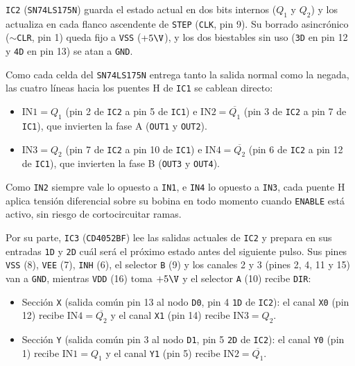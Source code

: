 \texttt{IC2} (\texttt{SN74LS175N}) guarda el estado actual en dos bits internos ($Q_1$ y $Q_2$) y los actualiza
en cada flanco ascendente de \texttt{STEP} (\texttt{CLK}, pin 9). Su borrado asincrónico ($\sim$\texttt{CLR},
pin 1) queda fijo a \texttt{VSS} ($+5\V$), y los dos biestables sin uso (\texttt{3D} en pin 12 y \texttt{4D} en
pin 13) se atan a \texttt{GND}.

Como cada celda del \texttt{SN74LS175N} entrega tanto la salida normal como la negada, las cuatro líneas hacia
los puentes H de \texttt{IC1} se cablean directo:

\begin{itemize}
  \item $\text{IN1} = Q_1$ (pin 2 de \texttt{IC2} a pin 5 de \texttt{IC1}) e $\text{IN2} = \overline{Q_1}$ (pin 3
    de \texttt{IC2} a pin 7 de \texttt{IC1}), que invierten la fase A (\texttt{OUT1} y \texttt{OUT2}).
  \item $\text{IN3} = Q_2$ (pin 7 de \texttt{IC2} a pin 10 de \texttt{IC1}) e $\text{IN4} = \overline{Q_2}$ (pin 6
    de \texttt{IC2} a pin 12 de \texttt{IC1}), que invierten la fase B (\texttt{OUT3} y \texttt{OUT4}).
\end{itemize}

Como \texttt{IN2} siempre vale lo opuesto a \texttt{IN1}, e \texttt{IN4} lo opuesto a \texttt{IN3}, cada puente H
aplica tensión diferencial sobre su bobina en todo momento cuando \texttt{ENABLE} está activo, sin riesgo de
cortocircuitar ramas.

Por su parte, \texttt{IC3} (\texttt{CD4052BF}) lee las salidas actuales de \texttt{IC2} y prepara en sus entradas
\texttt{1D} y \texttt{2D} cuál será el próximo estado antes del siguiente pulso. Sus pines \texttt{VSS} (8),
\texttt{VEE} (7), \texttt{INH} (6), el selector \texttt{B} (9) y los canales 2 y 3 (pines 2, 4, 11 y 15) van a
\texttt{GND}, mientras \texttt{VDD} (16) toma $+5\V$ y el selector \texttt{A} (10) recibe \texttt{DIR}:

\begin{itemize}
  \item Sección \texttt{X} (salida común pin 13 al nodo \texttt{D0}, pin 4 \texttt{1D} de \texttt{IC2}): el canal
    \texttt{X0} (pin 12) recibe $\text{IN4} = \overline{Q_2}$ y el canal \texttt{X1} (pin 14) recibe
    $\text{IN3} = Q_2$.
  \item Sección \texttt{Y} (salida común pin 3 al nodo \texttt{D1}, pin 5 \texttt{2D} de \texttt{IC2}): el canal
    \texttt{Y0} (pin 1) recibe $\text{IN1} = Q_1$ y el canal \texttt{Y1} (pin 5) recibe
    $\text{IN2} = \overline{Q_1}$.
\end{itemize}

